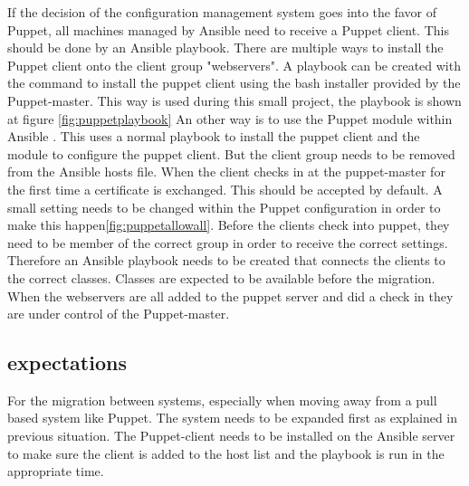 If the decision of the configuration management system goes into the favor of Puppet, all machines managed by Ansible need to receive a Puppet client. This should be done by an Ansible playbook. There are multiple ways to install the Puppet client onto the client group "webservers". A playbook can be created with the command to install the puppet client using the bash installer provided by the Puppet-master. This way is used during this small project, the playbook is shown at figure \ref{fig:puppetplaybook} An other way is to use the Puppet module within Ansible \cite{ansiblepuppet}. This uses a normal playbook to install the puppet client and the module to configure the puppet client. But the client group needs to be removed from the Ansible hosts file. When the client checks in at the puppet-master for the first time a certificate is exchanged. This should be accepted by default. A small setting needs to be changed within the Puppet configuration in order to make this happen\ref{fig:puppetallowall}. Before the clients check into puppet, they need to be member of the correct group in order to receive the correct settings. Therefore an Ansible playbook needs to be created that connects the clients to the correct classes. Classes are expected to be available before the migration. When the webservers are all added to the puppet server and did a check in they are under control of the Puppet-master.

\subsection{expectations}\label{subsec:expectations}
For the migration between systems, especially when moving away from a pull based system like Puppet. The system needs to be expanded first as explained in previous situation. The Puppet-client needs to be installed on the Ansible server to make sure the client is added to the host list and the playbook is run in the appropriate time. 


